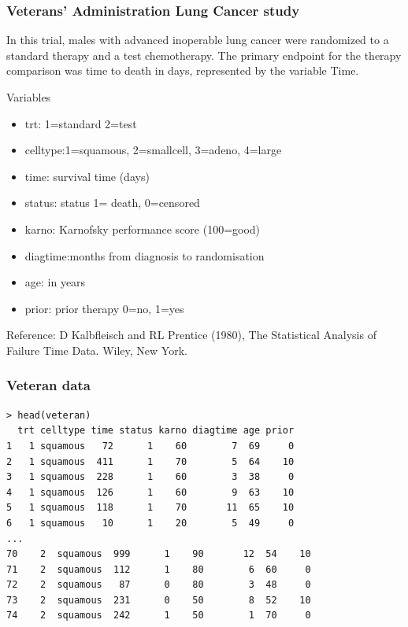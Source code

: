 \documentclass[12pt]{beamer}
\begin{document}
\begin{frame}[fragile]
\frametitle{Veterans' Administration Lung Cancer study}

In this trial, males with advanced inoperable lung cancer were randomized to a standard therapy and a test chemotherapy. The primary endpoint for the therapy comparison was time to death in days, represented by the variable Time.

Variables 

\begin{itemize}
\item trt:	 1=standard 2=test
\item celltype:1=squamous, 2=smallcell, 3=adeno, 4=large
\item time:	 survival time (days)
\item status:	 status 1= death, 0=censored 
\item karno:	 Karnofsky performance score (100=good)
\item diagtime:months from diagnosis to randomisation
\item age:	 in years
\item prior:	 prior therapy 0=no, 1=yes
\end{itemize}

{\scriptsize Reference: D Kalbfleisch and RL Prentice (1980), The Statistical Analysis of Failure Time Data. Wiley, New York.}
\end{frame}


\begin{frame}[fragile]
\frametitle{Veteran data}

{\scriptsize \begin{verbatim}
> head(veteran)
  trt celltype time status karno diagtime age prior
1   1 squamous   72      1    60        7  69     0
2   1 squamous  411      1    70        5  64    10
3   1 squamous  228      1    60        3  38     0
4   1 squamous  126      1    60        9  63    10
5   1 squamous  118      1    70       11  65    10
6   1 squamous   10      1    20        5  49     0   
...
70    2  squamous  999      1    90       12  54    10
71    2  squamous  112      1    80        6  60     0
72    2  squamous   87      0    80        3  48     0
73    2  squamous  231      0    50        8  52    10
74    2  squamous  242      1    50        1  70     0

\end{verbatim}
}
\end{frame}
\end{document}

